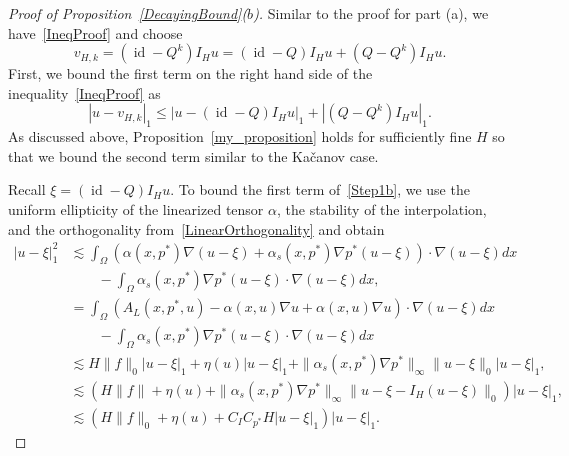 \documentclass{article}
\begin{document}
\begin{proof}[Proof of Proposition~\ref{DecayingBound}($b$)] 
Similar to the proof for part (a), we have~\eqref{IneqProof} and choose \[v_{H,k}=(\operatorname{id}-Q^k)I_Hu=(\operatorname{id}-Q)I_Hu+(Q-Q^k)I_Hu.\]
First, we bound the first term on the right hand side of the inequality~\eqref{IneqProof} as 
\begin{equation}\label{Step1b}
    |u-v_{H,k}|_1 \leq |u-(\operatorname{id}-Q)I_Hu|_1 +|(Q-Q^k)I_Hu|_1.
\end{equation}
As discussed above, Proposition~\ref{my_proposition} holds for sufficiently fine $H$ so that we bound the second term similar to the Kačanov case.
 
Recall $\xi=(\operatorname{id}-Q)I_Hu$.
To bound the first term of~\eqref{Step1b}, we use the uniform ellipticity of the linearized tensor $\alpha$, the stability of the interpolation, and the orthogonality from~\eqref{LinearOrthogonality} and obtain
\begin{align*}
     |u-\xi|_1^2 &\lesssim \int_{\Omega} (\alpha(x,p^*)\nabla(u-\xi)+\alpha_s(x,p^*)\nabla p^*(u-\xi))\cdot\nabla(u-\xi)dx\\ &\qquad-\int_{\Omega} \alpha_s(x,p^*)\nabla p^*(u-\xi)\cdot\nabla(u-\xi)dx,   \\
     &=\int_{\Omega} (A_L(x,p^*,u) - \alpha(x,u)\nabla u+\alpha(x,u)\nabla u )\cdot\nabla(u-\xi)dx \\&\qquad-\int_{\Omega} \alpha_s(x,p^*)\nabla p^*(u-\xi)\cdot\nabla(u-\xi)dx \\
   & \lesssim H\|f\|_0|u-\xi|_1+\eta(u)|u-\xi|_1 + \|\alpha_s(x,p^*)\nabla p^*\|_\infty \|u-\xi\|_0|u-\xi|_1, \\
   & \lesssim (H\|f\| +\eta(u)  + \|\alpha_s(x,p^*)\nabla p^*\|_\infty \|u-\xi-I_H(u-\xi)\|_0)|u-\xi|_1, \\
   & \lesssim (H\|f\|_0+\eta(u) +C_IC_{p^*}H|u-\xi|_1)|u-\xi|_1.
\end{align*}


\end{proof}
\end{document}
